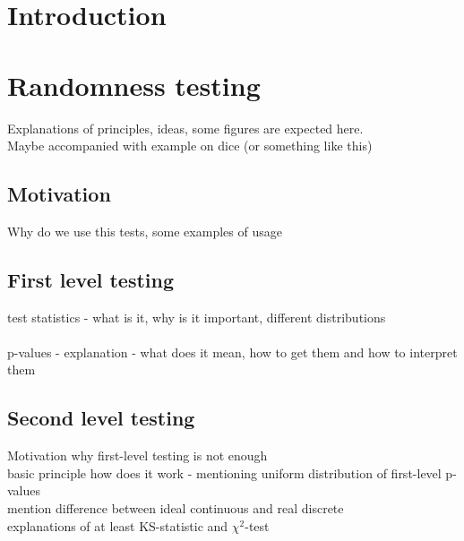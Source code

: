 \documentclass[
  digital,     %
  oneside,     %
  nosansbold,  %
  nocolorbold, %
  nolof,         %
  nolot,         %
]{fithesis4}
\begin{document}
\chapter*{Introduction}

\chapter{Randomness testing}
Explanations of principles, ideas, some figures are expected here.\\
Maybe accompanied with example on dice (or something like this)
\section{Motivation}
Why do we use this tests, some examples of usage


\section{First level testing}
test statistics - what is it, why is it important, different distributions\\
\\
p-values - explanation - what does it mean, how to get them and how to interpret them

  
\section{Second level testing}

 Motivation why first-level testing is not enough\\
 basic principle how does it work - mentioning uniform distribution of first-level p-values\\
 mention difference between ideal continuous and real discrete
 \\
 explanations of at least KS-statistic and $\chi^2$-test
\end{document}
